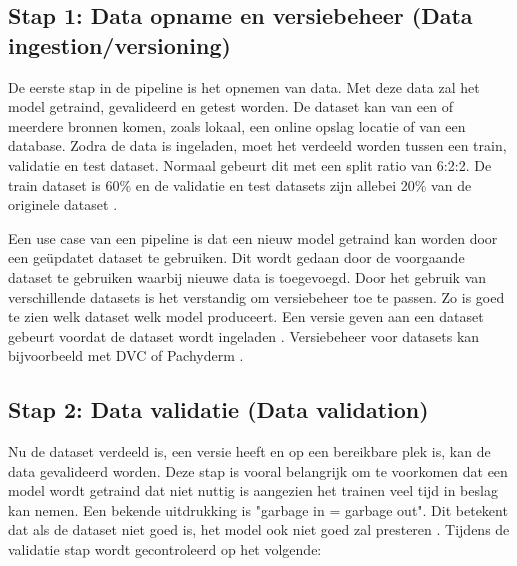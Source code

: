 \subsection{Stap 1: Data opname en versiebeheer (Data ingestion/versioning)}\label{subsec:ch4-data-opname-en-versiebeheer}
De eerste stap in de pipeline is het opnemen van data. Met deze data zal het model getraind, gevalideerd en getest worden. De dataset kan van een of meerdere bronnen komen, zoals lokaal, een online opslag locatie of van een database. Zodra de data is ingeladen, moet het verdeeld worden tussen een train, validatie en test dataset. Normaal gebeurt dit met een split ratio van 6:2:2. De train dataset is 60\% en de validatie en test datasets zijn allebei 20\% van de originele dataset \cite[p.~27-37]{building-machine-learning-pipelines-oreilly}.

Een use case van een pipeline is dat een nieuw model getraind kan worden door een geüpdatet dataset te gebruiken. Dit wordt gedaan door de voorgaande dataset te gebruiken waarbij nieuwe data is toegevoegd. Door het gebruik van verschillende datasets is het verstandig om versiebeheer toe te passen. Zo is goed te zien welk dataset welk model produceert. Een versie geven aan een dataset gebeurt voordat de dataset wordt ingeladen \cite[p.~39-40]{building-machine-learning-pipelines-oreilly}. Versiebeheer voor datasets kan bijvoorbeeld met DVC \cite{dvc} of Pachyderm \cite{pachyderm}.



\subsection{Stap 2: Data validatie (Data validation)}\label{subsec:ch4-data-validatie}
Nu de dataset verdeeld is, een versie heeft en op een bereikbare plek is, kan de data gevalideerd worden. Deze stap is vooral belangrijk om te voorkomen dat een model wordt getraind dat niet nuttig is aangezien het trainen veel tijd in beslag kan nemen. Een bekende uitdrukking is "garbage in = garbage out". Dit betekent dat als de dataset niet goed is, het model ook niet goed zal presteren \cite[p.~43]{building-machine-learning-pipelines-oreilly}. Tijdens de validatie stap wordt gecontroleerd op het volgende:

